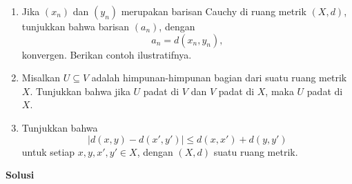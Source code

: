 \documentclass[11pt,a4paper]{article}
\begin{document}
\begin{enumerate}
  \item Jika $(x_n)$ dan $(y_n)$ merupakan barisan Cauchy di ruang metrik $(X,d)$,
        tunjukkan bahwa barisan $(a_n)$, dengan
        \[
          a_n=d(x_n,y_n),
        \]
        konvergen. Berikan contoh ilustratifnya.

  \item Misalkan $U\subseteq V$ adalah himpunan-himpunan bagian dari suatu
        ruang metrik $X$. Tunjukkan bahwa jika $U$ padat di $V$ dan $V$ padat
        di $X$, maka $U$ padat di $X$.

  \item Tunjukkan bahwa
        \[
          |d(x,y)-d(x',y')|\le d(x,x')+d(y,y')
        \]
        untuk setiap $x,y,x',y'\in X$, dengan $(X,d)$ suatu ruang metrik.
\end{enumerate}

\newpage
\begin{center}
  \textbf{\Large Solusi}
\end{center}
\vspace{6pt}
\end{document}
